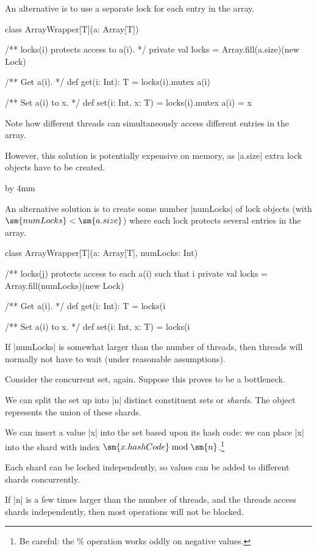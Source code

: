 \documentclass[notes,color]{sepslide0}
\begin{document}
\begin{slide}

An alternative is to use a separate lock for each entry in the array.
%
\begin{scala}
class ArrayWrapper[T](a: Array[T]){
  /** locks(i) protects access to a(i). */
  private val locks = Array.fill(a.size)(new Lock)

  /** Get a(i). */
  def get(i: Int): T = locks(i).mutex{ a(i) }

  /** Set a(i) to x. */
  def set(i: Int, x: T) = locks(i).mutex{ a(i) = x }
}
\end{scala}
%
Note how different threads can simultaneously access different entries
in the array.

However, this solution is potentially expensive on memory, as |a.size|
extra lock objects have to be created. 
\end{slide}


{\advance \slideheight by 4mm
\begin{slide}

An alternative solution is to create some number |numLocks| of lock
objects (with $\sm{numLocks} < \sm{a.size}$) where each lock protects
several entries in the array.
%
\begin{scala}
class ArrayWrapper[T](a: Array[T], numLocks: Int){
  /** locks(j) protects access to each a(i) such that i%
  private val locks = Array.fill(numLocks)(new Lock)

  /** Get a(i). */
  def get(i: Int): T = locks(i%

  /** Set a(i) to x. */
  def set(i: Int, x: T) = locks(i%
}
\end{scala}
%
If |numLocks| is somewhat larger than the number of threads, then
threads will normally not have to wait (under reasonable assumptions).
\end{slide}}


\begin{slide}

Consider the concurrent set, again.  Suppose this proves to be a bottleneck.

We can split the set up into |n| distinct constituent sets or \emph{shards}.
The object represents the union of these shards.

We can insert a value |x| into the set based upon its hash code: we can place
|x| into the shard with index $\sm{x.hashCode} \bmod
\sm{n}$.\footnote{Be careful: the \% operation works oddly on negative
  values.}

Each shard can be locked independently, so values can be added to different
shards concurrently. 


If |n| is a few times larger than the number of threads, and the threads
access shards independently, then most operations will not be blocked.

\vfill
\end{slide}
\end{document}
